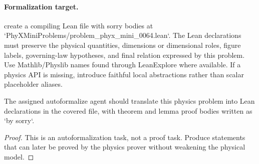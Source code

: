 \paragraph{Formalization target.}
create a compiling Lean file with sorry bodies at `PhyXMiniProblems/problem\_phyx\_mini\_0064.lean`. The Lean declarations must preserve the physical quantities, dimensions or dimensional roles, figure labels, governing-law hypotheses, and final relation expressed by this problem.
Use Mathlib/Physlib names found through LeanExplore where available. If a physics API is missing, introduce faithful local abstractions rather than scalar placeholder aliases.

\begin{theorem}
\label{thm:physics:phyx_mini_0064:target}
The assigned autoformalize agent should translate this physics problem into Lean declarations in the covered file, with theorem and lemma proof bodies written as `by sorry`.
\end{theorem}
\begin{proof}
This is an autoformalization task, not a proof task. Produce statements that can later be proved by the physics prover without weakening the physical model.
\end{proof}

